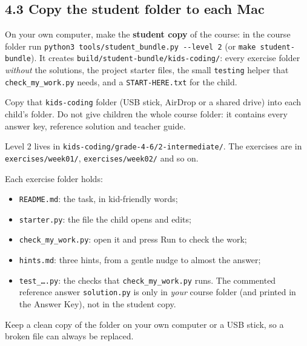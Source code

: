 \documentclass[level=2,teacher]{kidscode}
\begin{document}
\subsection{4.3 Copy the student folder to each Mac}
\begin{checklist}
  \item On your own computer, make the \textbf{student copy} of the course: in the course folder run
        \texttt{python3 tools/student\_bundle.py -{}-level 2} (or \texttt{make student-bundle}). It creates
        \texttt{build/\allowbreak student-bundle/\allowbreak kids-coding/}: every exercise folder \emph{without} the solutions, the
        project starter files, the small \texttt{testing} helper that \texttt{check\_my\_work.py} needs, and a
        \texttt{START-HERE.txt} for the child.
  \item Copy that \texttt{kids-coding} folder (USB stick, AirDrop or a shared drive) into each child's
         folder. Do not give children the whole course folder: it contains every answer key,
        reference solution and teacher guide.
  \item Level 2 lives in \texttt{kids-coding/grade-4-6/2-intermediate/}. The exercises are in
        \texttt{exercises/week01/}, \texttt{exercises/week02/} and so on.
  \item Each exercise folder holds:
        \begin{itemize}[itemsep=0pt]
          \item \texttt{README.md}: the task, in kid-friendly words;
          \item \texttt{starter.py}: the file the child opens and edits;
          \item \texttt{check\_my\_work.py}: open it and press Run to check the work;
          \item \texttt{hints.md}: three hints, from a gentle nudge to almost the answer;
          \item \texttt{test\_\ldots.py}: the checks that \texttt{check\_my\_work.py} runs. The commented reference answer
                \texttt{solution.py} is only in \emph{your} course folder (and printed in the Answer Key), not in the student copy.
        \end{itemize}
  \item Keep a clean copy of the folder on your own computer or a USB stick, so a broken file can
        always be replaced.
\end{checklist}
\end{document}
